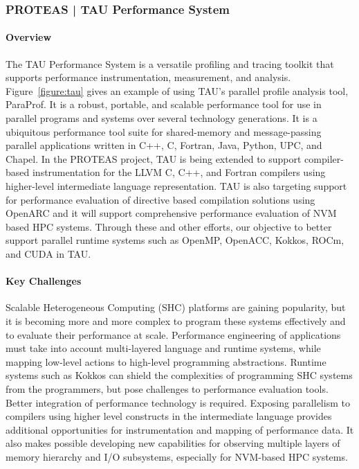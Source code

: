 \subsubsection{ PROTEAS | TAU Performance System}\label{subsubsect:tau}

\paragraph{Overview} 
The TAU Performance System is a versatile profiling and tracing toolkit that supports performance instrumentation, measurement, and analysis.  Figure~\ref{figure:tau} gives an example of using TAU's parallel profile analysis tool, ParaProf. It is a robust, portable, and scalable performance tool for use in parallel programs and systems over several technology generations. It is a ubiquitous performance tool suite for shared-memory and message-passing parallel applications written in C++, C, Fortran, Java, Python, UPC, and Chapel. In the PROTEAS project, TAU is being extended to support compiler-based instrumentation for the LLVM C, C++, and Fortran compilers using higher-level intermediate language representation. TAU is also targeting support for performance evaluation of directive based compilation solutions using OpenARC and it will support comprehensive performance evaluation of NVM based HPC systems.  Through these and other efforts, our objective to better support parallel runtime systems such as OpenMP, OpenACC, Kokkos, ROCm, and CUDA in TAU. 

\paragraph{Key Challenges} 
Scalable Heterogeneous Computing (SHC) platforms are gaining popularity, but it is becoming more and more complex to program these systems effectively and to evaluate their performance at scale. Performance engineering of applications must take into account multi-layered language and runtime systems, while mapping low-level actions to high-level programming abstractions.  Runtime systems such as Kokkos can shield the complexities of programming SHC systems from the programmers, but pose challenges to performance evaluation tools.  Better integration of performance technology is required.  Exposing parallelism to compilers using higher level constructs in the intermediate language provides additional opportunities for instrumentation and mapping of performance data.  It also makes possible developing new capabilities for observing multiple layers of memory hierarchy and I/O subsystems, especially for NVM-based HPC systems. 

